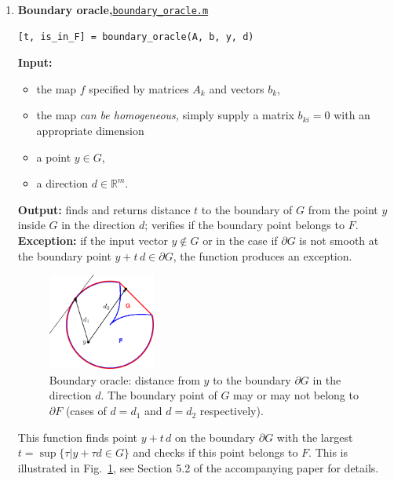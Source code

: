 \documentclass[a4paper]{article}
\newcommand{\R}{\mathbb{R}}
\theoremstyle{definition}
\begin{document}
\begin{enumerate}
The function returns {\tt is\_infeasible=1} if the desired hyperplane was found.
In this case $y\notin G$ and consequently $y\notin F$, implying there is no $x\in \mathbb{V}$ such that $y=f(x)$, i.e.~this point is infeasible.
If the hyperplane was not found the function returns {\tt is\_infeasible=0}, which means $y$ does belong to $G$ but the feasibility  of $y$ with respect to $F$ is uncertain.
\newpage
\item {\bf Boundary oracle,\hskip 6pt}\underline{\tt boundary\_oracle.m}
\begin{verbatim}
[t, is_in_F] = boundary_oracle(A, b, y, d)
\end{verbatim}
{\bf Input:}
\begin{itemize}
	\item the map $f$ specified by matrices $A_k$ and vectors $b_k$,
	\item the map {\it can be homogeneous,} simply supply a matrix $b_{ki}=0$ with an appropriate dimension
	\item a point $y\in G$,
	\item a direction $d\in\R^m$.
\end{itemize}
{\bf Output:}  finds and returns distance $t$ to the boundary of $G$ from the point $y$ inside $G$ in the direction $d$; verifies if the boundary point belongs to $F$.\\
{\bf Exception:}  if the input vector $y\notin G$ or in the case if $\partial G$ is not smooth at the boundary point $y+t\,d\in \partial G$, the function produces an exception.


\begin{figure}[H]
	\centering\includegraphics[width=100pt]{fig/boundary_oracle}
\captionsetup{width=.8\linewidth}
	\caption{Boundary oracle: distance from $y$ to the boundary $\partial G$ in the direction $d$.
	The boundary point of $G$ may or may not belong to $\partial F$ (cases of $d=d_1$ and $d=d_2$ respectively).}
\label{fig:two}
\end{figure}


This function finds point $y+t\,d$ on the boundary $\partial G$ with the largest $ {t} = \sup\{\tau\big| y+\tau d\in G\}$ and checks if this point belongs to $F$. 
This is illustrated in Fig.~\ref{fig:two}, see Section 5.2 of the accompanying paper for details.


\end{enumerate}
\end{document}
